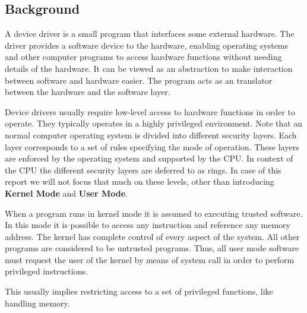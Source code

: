 \subsection{Background}
A device driver is a small program that interfaces some external hardware. The driver provides a software device to the hardware, enabling operating systems and other computer programs to access hardware functions without needing details of the hardware. It can be viewed as an abstraction to make interaction between software and hardware easier. The program acts as an translator between the hardware and the software layer. 

Device drivers usually require low-level access to hardware functions in order to operate. They typically operates in a highly privileged environment. Note that an normal computer operating system is divided into different security layers. Each layer corresponds to a set of rules specifying the mode of operation. These layers are enforced by the operating system and supported by the CPU. In context of the CPU the different security layers are deferred to as rings. In case of this report we will not focus that much on these levels, other than introducing {\bf Kernel Mode} and {\bf User Mode}. 

When a program runs in kernel mode it is assumed to executing trusted software. In this mode it is possible to access any instruction and reference any memory address. The kernel has complete control of every aspect of the system. All other programs are considered to be untrusted programs. Thus, all user mode software must request the user of the kernel by means of system call in order to perform privileged instructions. 


This usually implies restricting access to a set of privileged functions, like handling memory. 




